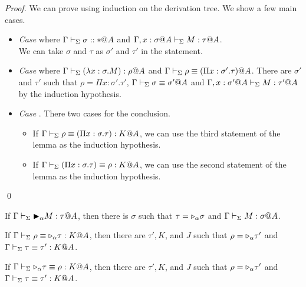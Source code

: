 \begin{proof}
	We can prove using induction on the derivation tree.
	We show a few main cases.
				
	\begin{itemize}
		\item \textit{Case} \TAbs{} where $\Gamma\vdash_\Sigma \sigma::*@A$ and $\G,x:\sigma@A\V M:\tau@A$. \\
		      We can take $\sigma$ and $\tau$ as $\sigma'$ and $\tau'$ in the statement. 
		      		      		      		      	      	      	      
		\item \textit{Case} \TConv{} where \(\G \V (\lambda x:\sigma.M) : \rho@A\) and \(\Gamma \vdash_\Sigma \rho \equiv (\Pi x:\sigma'.\tau)@A\).
		      There are $\sigma'$ and $\tau'$ such that
		      $\rho = \Pi x:\sigma'.\tau'$, $\Gamma \vdash_\Sigma \sigma \equiv \sigma'@A$ and $\Gamma ,x:\sigma'@A\vdash_\Sigma M:\tau'@A$
		      by the induction hypothesis.
		      	      	     		      	      	      	      
		\item \textit{Case} \QTRefl.
		      There two cases for the conclusion.
		      \begin{itemize}
		      	\item If $\Gamma \vdash_\Sigma \rho \equiv (\Pi x:\sigma.\tau) : K @A$,
		      	      we can use the third statement of the lemma as the induction hypothesis.
		      	\item If $\Gamma \vdash_\Sigma (\Pi x:\sigma.\tau) \equiv \rho : K @A$,
		      	      we can use the second statement of the lemma as the induction hypothesis.
		      \end{itemize}
	\end{itemize}
\qed\end{proof}

\begin{lemma}
	\begin{item}
		  \item If $\G \V \TB_\alpha M : \tau@A$, then 
		  there is $\sigma$ such that $\tau = {\mathop{\triangleright}}_\alpha \sigma$ and $\G \V M : \sigma@A$.
	      \item If $\Gamma \vdash_\Sigma \rho \equiv {\mathop{\triangleright}}_\alpha \tau : K @A$, then there are $\tau', K$, and $J$ such that
	      $\rho = {\mathop{\triangleright}}_\alpha \tau'$ and $\Gamma \vdash_\Sigma \tau \equiv \tau' : K @A$.
	      \item If $\Gamma \vdash_\Sigma {\mathop{\triangleright}}_\alpha \tau \equiv \rho : K @A$, then there are $\tau', K$, and $J$ such that
	      $\rho = {\mathop{\triangleright}}_\alpha \tau'$ and $\Gamma \vdash_\Sigma \tau \equiv \tau' : K @A$.
	\end{item}
\end{lemma}

